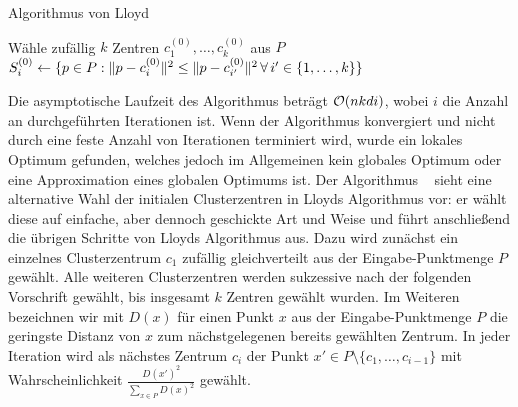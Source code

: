 \begin{algorithm}[H]
\label{algo:lloyd}
\caption{Algorithmus von Lloyd}
	\DontPrintSemicolon
	
	\BlankLine
	
	Wähle zufällig $k$ Zentren $c_1^{(0)}, \dots, c_k^{(0)}$ aus $P$\;
	$S_i^{(0)} \leftarrow \{ p \in P : \lVert {p} - {c_i^{(0)}} \rVert^2 \leq \lVert {p} - {c_{i'}^{(0)}} \rVert^2 \, \forall \, i' \in \{ 1, \dots, k \} \}$\;
\end{algorithm}

Die asymptotische Laufzeit des Algorithmus beträgt $\mathcal{O}(nkdi)$, wobei $i$ die Anzahl an durchgeführten Iterationen ist.
Wenn der Algorithmus konvergiert und nicht durch eine feste Anzahl von Iterationen terminiert wird, wurde ein lokales
Optimum gefunden, welches jedoch im Allgemeinen kein globales Optimum oder eine Approximation eines globalen Optimums ist.
\absatz
Der Algorithmus \kmpp~\cite{ArthurV07} sieht eine alternative Wahl der initialen Clusterzentren in Lloyds Algorithmus vor: er
wählt diese auf einfache, aber dennoch geschickte Art und Weise und führt anschließend die übrigen Schritte von Lloyds
Algorithmus aus.
Dazu wird zunächst ein einzelnes Clusterzentrum $c_1$ zufällig gleichverteilt aus der Eingabe-Punktmenge $P$ gewählt.
Alle weiteren Clusterzentren werden sukzessive nach der folgenden Vorschrift gewählt, bis insgesamt $k$ Zentren gewählt wurden.
Im Weiteren bezeichnen wir mit $D(x)$ für einen Punkt $x$ aus der Eingabe-Punktmenge $P$ die geringste Distanz von $x$ zum
nächstgelegenen bereits gewählten Zentrum. In jeder Iteration wird als nächstes Zentrum $c_i$ der Punkt
$x' \in P \setminus \{ c_1, \dots, c_{i-1} \}$ mit Wahrscheinlichkeit $\frac{D(x')^2}{\sum_{x \in P} D(x)^2}$ gewählt.

